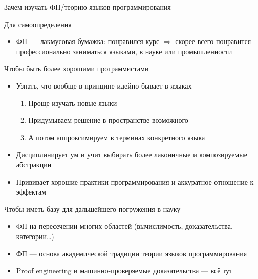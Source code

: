     \begin{frame}{Зачем изучать ФП/теорию языков программирования}
        \vspace{-0.5em}
        \begin{block}{Для самоопределения}
            \begin{itemize}
                \item ФП~--- лакмусовая бумажка: понравился курс $\Rightarrow$ скорее всего понравится профессионально заниматься языками, в науке или промышленности
            \end{itemize}
        \end{block}
        \pause
        \begin{block}{Чтобы быть более хорошими программистами}
            \begin{itemize}
                \item Узнать, что вообще в принципе идейно бывает в языках
                \begin{enumerate}
                    \item Проще изучать новые языки
                    \item Придумываем решение в пространстве возможного
                    \item[\then] А потом аппроксимируем в терминах конкретного языка
                \end{enumerate}
                \item Дисциплинирует ум и учит выбирать более лаконичные и композируемые абстракции
                \item Прививает хорошие практики программирования и аккуратное отношение к эффектам
            \end{itemize}
        \end{block}
        \pause
        \begin{block}{Чтобы иметь базу для дальшейшего погружения в науку}
            \begin{itemize}
                \item ФП на пересечении многих областей (вычислимость, доказательства, категории\ldots)
                \item ФП --- основа академической традиции теории языков программирования
                \item Proof engineering и машинно-проверяемые доказательства --- всё тут
            \end{itemize}
        \end{block}
    \end{frame}

